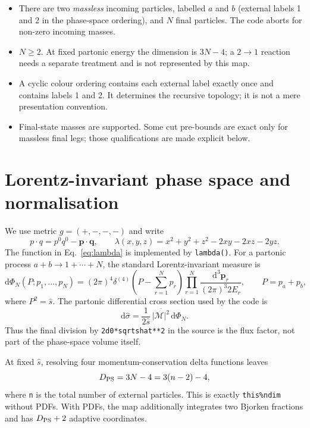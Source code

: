 \documentclass[11pt,a4paper]{article}
\newcommand{\shat}{\hat{s}}
\newcommand{\dd}{\mathrm{d}}
\newcommand{\cM}{\mathcal{M}}
\newcommand{\code}[1]{\texttt{#1}}
\newcommand{\lam}{\lambda}
\begin{document}
\begin{itemize}
\item There are two \emph{massless} incoming particles, labelled $a$ and $b$
  (external labels 1 and 2 in the phase-space ordering), and $N$ final
  particles.  The code aborts for non-zero incoming masses.
\item $N\geq2$.  At fixed partonic energy the dimension is $3N-4$; a $2\to1$
  reaction needs a separate treatment and is not represented by this map.
\item A cyclic colour ordering contains each external label exactly once and
  contains labels 1 and 2.  It determines the recursive topology; it is not a
  mere presentation convention.
\item Final-state masses are supported.  Some cut pre-bounds are exact only
  for massless final legs; those qualifications are made explicit below.
\end{itemize}

\section{Lorentz-invariant phase space and normalisation}

We use metric $g=(+,-,-,-)$ and write
\begin{equation}
 p\mathbin{\cdot}q=p^0q^0-\boldsymbol p\mathbin{\cdot}\boldsymbol q,
 \qquad
 \lam(x,y,z)=x^2+y^2+z^2-2xy-2xz-2yz .
 \label{eq:lambda}
\end{equation}
The function in Eq.~\eqref{eq:lambda} is implemented by \code{lambda()}.
For a partonic process $a+b\to1+\cdots+N$, the standard Lorentz-invariant
measure is
\begin{equation}
 \dd\Phi_N(P;p_1,\ldots,p_N)=
 (2\pi)^4\delta^{(4)}\!\left(P-\sum_{r=1}^{N}p_r\right)
 \prod_{r=1}^{N}\frac{\dd^3\boldsymbol p_r}{(2\pi)^3 2E_r},
 \qquad P=p_a+p_b,
 \label{eq:lips}
\end{equation}
where $P^2=\shat$.  The partonic differential cross section used by the code is
\begin{equation}
 \dd\hat\sigma=\frac{1}{2\shat}\,
 \overline{|\cM|^2}\,\dd\Phi_N .
 \label{eq:flux}
\end{equation}
Thus the final division by \code{2d0*sqrtshat**2} in the source is the flux
factor, not part of the phase-space volume itself.

At fixed $\shat$, resolving four momentum-conservation delta functions leaves
\begin{equation}
 D_{\rm PS}=3N-4=3(n-2)-4,
 \label{eq:dimension}
\end{equation}
where \code{n} is the total number of external particles.  This is exactly
\code{this\%ndim} without PDFs.  With PDFs, the map additionally integrates
two Bjorken fractions and has $D_{\rm PS}+2$ adaptive coordinates.
\end{document}
